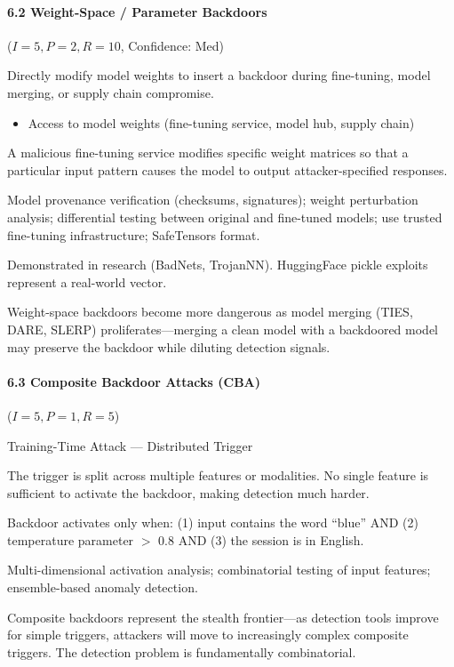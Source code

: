 \documentclass[conference]{IEEEtran}
\newenvironment{attackentry}{\begin{description}[style=unboxed,leftmargin=0cm,itemsep=1pt,parsep=1pt,topsep=2pt,font=\sffamily\small\color{accentdark}]}{\end{description}}
\begin{document}
\paragraph{6.2 Weight-Space / Parameter Backdoors} ($I{=}5, P{=}2, R{=}10$, Confidence: Med)
\begin{attackentry}
\item[Mechanism:] Directly modify model weights to insert a backdoor during fine-tuning, model merging, or supply chain compromise.
\item[Preconditions:] \begin{itemize}[nosep,leftmargin=*] \item Access to model weights (fine-tuning service, model hub, supply chain) \end{itemize}
\item[Example:] A malicious fine-tuning service modifies specific weight matrices so that a particular input pattern causes the model to output attacker-specified responses.
\item[Mitigations:] Model provenance verification (checksums, signatures); weight perturbation analysis; differential testing between original and fine-tuned models; use trusted fine-tuning infrastructure; SafeTensors format.
\item[Evidence:] Demonstrated in research (BadNets, TrojanNN). HuggingFace pickle exploits represent a real-world vector.
\item[Novel Inference (Hypothesized):] Weight-space backdoors become more dangerous as model merging (TIES, DARE, SLERP) proliferates---merging a clean model with a backdoored model may preserve the backdoor while diluting detection signals.
\end{attackentry}

\paragraph{6.3 Composite Backdoor Attacks (CBA)} ($I{=}5, P{=}1, R{=}5$)
\begin{attackentry}
\item[Category:] Training-Time Attack --- Distributed Trigger
\item[How it works:] The trigger is split across multiple features or modalities. No single feature is sufficient to activate the backdoor, making detection much harder.
\item[Example:] Backdoor activates only when: (1) input contains the word ``blue'' AND (2) temperature parameter $>$ 0.8 AND (3) the session is in English.
\item[Mitigations:] Multi-dimensional activation analysis; combinatorial testing of input features; ensemble-based anomaly detection.
\item[Novel Inference (Hypothesized):] Composite backdoors represent the stealth frontier---as detection tools improve for simple triggers, attackers will move to increasingly complex composite triggers. The detection problem is fundamentally combinatorial.
\end{attackentry}
\end{document}
